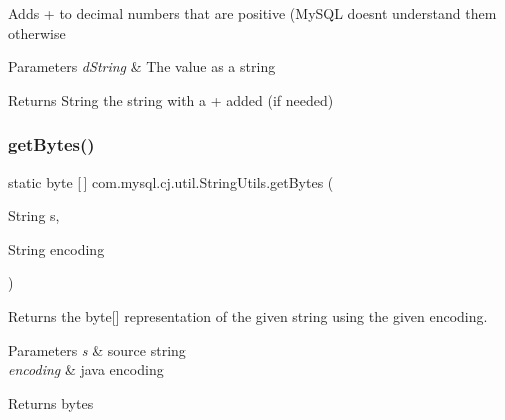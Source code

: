 Adds \textquotesingle{}+\textquotesingle{} to decimal numbers that are positive (My\+S\+QL doesn\textquotesingle{}t understand them otherwise


\begin{DoxyParams}{Parameters}
{\em d\+String} & The value as a string\\
\hline
\end{DoxyParams}
\begin{DoxyReturn}{Returns}
String the string with a \textquotesingle{}+\textquotesingle{} added (if needed) 
\end{DoxyReturn}
\mbox{\label{classcom_1_1mysql_1_1cj_1_1util_1_1_string_utils_a460ad9e9bb0873d806d2078891d8d416}} 
\subsubsection{\texorpdfstring{get\+Bytes()}{getBytes()}\hspace{0.1cm}{\footnotesize\ttfamily [1/8]}}
{\footnotesize\ttfamily static byte \mbox{[}$\,$\mbox{]} com.\+mysql.\+cj.\+util.\+String\+Utils.\+get\+Bytes (\begin{DoxyParamCaption}\item[{String}]{s,  }\item[{String}]{encoding }\end{DoxyParamCaption})\hspace{0.3cm}{\ttfamily [static]}}

Returns the byte\mbox{[}\mbox{]} representation of the given string using the given encoding.


\begin{DoxyParams}{Parameters}
{\em s} & source string \\
\hline
{\em encoding} & java encoding \\
\hline
\end{DoxyParams}
\begin{DoxyReturn}{Returns}
bytes 
\end{DoxyReturn}
\mbox{\label{classcom_1_1mysql_1_1cj_1_1util_1_1_string_utils_a8511f19038629bb79919340b70bf263b}} 
